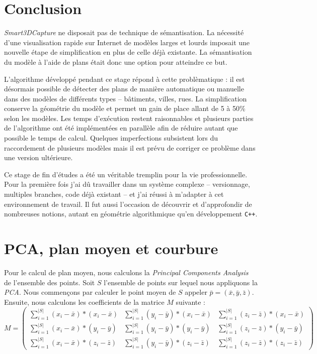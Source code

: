 ﻿\documentclass[12pt, twoside]{article}
\let\oldsection\section
\def\section{\cleardoublepage\oldsection}
\begin{document}
\newpage
\section*{Conclusion}
\textit{Smart3DCapture} ne disposait pas de technique de sémantisation. La nécessité d'une visualisation rapide sur Internet de modèles larges et lourds imposait une nouvelle étape de simplification en plus de celle déjà existante. La sémantisation du modèle à l'aide de plans était donc une option pour atteindre ce but.

L'algorithme développé pendant ce stage répond à cette problèmatique : il est désormais possible de détecter des plans de manière automatique ou manuelle dans des modèles de différents types -- bâtiments, villes, rues. La simplification conserve la géométrie du modèle et permet un gain de place allant de 5 à 50\% selon les modèles. Les temps d'exécution restent raisonnables et plusieurs parties de l'algorithme ont été implémentées en parallèle afin de réduire autant que possible le temps de calcul. Quelques imperfections subsistent lors du raccordement de plusieurs modèles mais il est prévu de corriger ce problème dans une version ultérieure.

Ce stage de fin d'études a été un véritable tremplin pour la vie professionnelle. Pour la première fois j'ai dû travailler dans un système complexe -- versionnage, multiples branches, code déjà existant -- et j'ai réussi à m'adapter à cet environnement de travail. Il fut aussi l'occasion de découvrir et d'approfondir de nombreuses notions, autant en géométrie algorithmique qu'en développement \texttt{C++}.

\newpage
\appendix
\section{PCA, plan moyen et courbure}
\label{annexe}
Pour le calcul de plan moyen, nous calculons la \textit{Principal Components Analysis} de l'ensemble des points. Soit $S$ l'ensemble de points sur lequel nous appliquons la \textit{PCA}. Nous commençons par calculer le point moyen de $S$ appeler $\bar{p} = (\bar{x},\bar{y},\bar{z})$. Ensuite, nous calculons les coefficients de la matrice $M$ suivante :
$$M =
 \begin{pmatrix}
  \sum\limits_{i=1}^{\vert S \vert} (x_i - \bar{x})*(x_i - \bar{x}) & \sum\limits_{i=1}^{\vert S \vert} (y_i - \bar{y})*(x_i - \bar{x}) & \sum\limits_{i=1}^{\vert S \vert} (z_i - \bar{z})*(x_i - \bar{x}) \\
  \sum\limits_{i=1}^{\vert S \vert} (x_i - \bar{x})*(y_i - \bar{y}) & \sum\limits_{i=1}^{\vert S \vert} (y_i - \bar{y})*(y_i - \bar{y}) & \sum\limits_{i=1}^{\vert S \vert} (z_i - \bar{z})*(y_i - \bar{y}) \\
  \sum\limits_{i=1}^{\vert S \vert} (x_i - \bar{x})*(z_i - \bar{z}) & \sum\limits_{i=1}^{\vert S \vert} (y_i - \bar{y})*(z_i - \bar{z}) & \sum\limits_{i=1}^{\vert S \vert} (z_i - \bar{z})*(z_i - \bar{z})
 \end{pmatrix}$$
\end{document}
